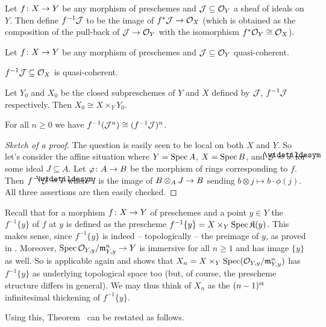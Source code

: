 \documentclass[a4paper,parskip=half,numbers=enddot, DIV=12]{scrreprt}
\renewcommand{\geq}{\geqslant}
\begin{document}
\begin{defi}
	Let $f\colon X\morphism Y$ be any morphism of preschemes and $\mathcal{J}\subseteq \mathcal{O}_Y$ a sheaf of ideals on $Y$. Then define $f^{-1}\mathcal{J}$ to be the image of $f^*\Jj\morphism\Oo_X$ (which is obtained as the composition of the pull-back of $\Jj\morphism \Oo_Y$ with the isomorphism $f^*\mathcal{O}_Y\cong \mathcal{O}_X$).
\end{defi}
\begin{lem}
	Let $f\colon X\morphism Y$ be any morphism of preschemes and $\mathcal{J}\subseteq \mathcal{O}_Y$ quasi-coherent.
	\begin{alphanumerate}
		\item $f^{-1}\mathcal{J}\subseteq \mathcal{O}_X$ is quasi-coherent.
		\item Let $Y_0$ and $X_0$ be the closed subpreschemes of $Y$ and $X$ defined by $\mathcal{J}$, $f^{-1}\mathcal{J}$ respectively. Then $X_0\cong X\times_YY_0$.
		\item For all $n\geq 0$ we have $f^{-1}(\mathcal{J}^n)\cong (f^{-1}\mathcal{J})^n$.
	\end{alphanumerate}
\end{lem}
\begin{proof}[Sketch of a proof]
	The question is easily seen to be local on both $X$ and $Y$. So let's consider the affine situation where $Y=\operatorname{Spec} A$, $X=\operatorname{Spec} B$, and $\Jj=\snake{J}$ for some ideal $J\subseteq A$. Let $\phi\colon A\morphism B$ be the morphism of rings corresponding to $f$. Then $f^{-1}\Jj=\snake{I}$ where $I$ is the image of $B\otimes_AJ\morphism B$ sending $b\otimes j\mapsto b\cdot \phi(j)$. All three assertions are then easily checked.
\end{proof}
\begin{rem}
	Recall that for a morphism $f\colon X\morphism Y$ of preschemes and a point $y\in Y$ the  $f^{-1}\{y\}$ of $f$ at $y$ is defined as the prescheme $f^{-1}\{y\}=X\times_Y\operatorname{Spec} \mathfrak{K}(y)$. This makes sense, since $f^{-1}\{y\}$ is indeed -- topologically -- the preimage of $y$, as proved in \cite[Corollary~1.3.3]{alggeo1}. Moreover, $\Spec \Oo_{Y,y}/\mm_{Y,y}^n\morphism Y$ is immersive for all $n\geq 1$ and has image $\{y\}$ as well. So \cite[Corollary~1.3.3]{alggeo1} is applicable again and shows that $X_n=X\times_Y\operatorname{Spec} (\mathcal{O}_{Y,y}/\mathfrak{m}_{Y,y}^n)$ has $f^{-1}\{y\}$ as underlying topological space too (but, of course, the prescheme structure differs in general). We may thus think of $X_n$ as the $(n-1)^{\text{st}}$ infinitesimal thickening of $f^{-1}\{y\}$. 
\end{rem}
Using this, Theorem~ can be restated as follows.
\end{document}
